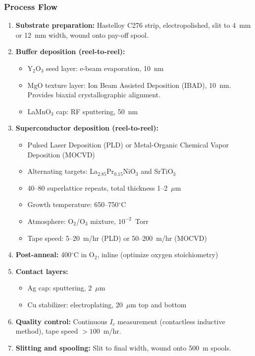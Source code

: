\documentclass[11pt, a4paper]{article}
\begin{document}
\subsubsection{Process Flow}

\begin{enumerate}[nosep]
  \item \textbf{Substrate preparation:} Hastelloy C276 strip,
        electropolished, slit to 4~mm or 12~mm width, wound onto
        pay-off spool.
  \item \textbf{Buffer deposition (reel-to-reel):}
    \begin{itemize}[nosep]
      \item Y$_2$O$_3$ seed layer: e-beam evaporation, 10~nm
      \item MgO texture layer: Ion Beam Assisted Deposition (IBAD),
            10~nm. Provides biaxial crystallographic alignment.
      \item LaMnO$_3$ cap: RF sputtering, 50~nm
    \end{itemize}
  \item \textbf{Superconductor deposition (reel-to-reel):}
    \begin{itemize}[nosep]
      \item Pulsed Laser Deposition (PLD) or Metal-Organic Chemical
            Vapor Deposition (MOCVD)
      \item Alternating targets: La$_{2.85}$Pr$_{0.15}$NiO$_3$ and
            SrTiO$_3$
      \item 40--80 superlattice repeats, total thickness 1--2~$\mu$m
      \item Growth temperature: 650--750$^\circ$C
      \item Atmosphere: O$_2$/O$_3$ mixture, $10^{-2}$~Torr
      \item Tape speed: 5--20~m/hr (PLD) or 50--200~m/hr (MOCVD)
    \end{itemize}
  \item \textbf{Post-anneal:} 400$^\circ$C in O$_2$, inline
        (optimize oxygen stoichiometry)
  \item \textbf{Contact layers:}
    \begin{itemize}[nosep]
      \item Ag cap: sputtering, 2~$\mu$m
      \item Cu stabilizer: electroplating, 20~$\mu$m top and bottom
    \end{itemize}
  \item \textbf{Quality control:} Continuous $I_c$ measurement
        (contactless inductive method), tape speed $> 100$~m/hr.
  \item \textbf{Slitting and spooling:} Slit to final width, wound
        onto 500~m spools.
\end{enumerate}
\end{document}
